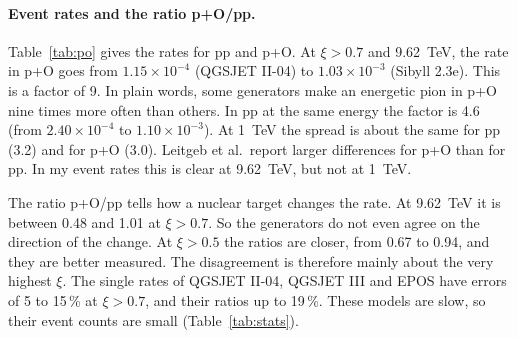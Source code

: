 \documentclass[11pt,a4paper]{article}
\begin{document}
\paragraph{Event rates and the ratio p+O/pp.}
Table~\ref{tab:po} gives the rates for pp and p+O.
At $\xi>0.7$ and 9.62~TeV, the rate in p+O goes from $1.15\times10^{-4}$ (QGSJET II-04) to $1.03\times10^{-3}$ (Sibyll 2.3e).
This is a factor of 9.
In plain words, some generators make an energetic pion in p+O nine times more often than others.
In pp at the same energy the factor is 4.6 (from $2.40\times10^{-4}$ to $1.10\times10^{-3}$).
At 1~TeV the spread is about the same for pp (3.2) and for p+O (3.0).
Leitgeb et al.\ report larger differences for p+O than for pp.
In my event rates this is clear at 9.62~TeV, but not at 1~TeV.

The ratio p+O/pp tells how a nuclear target changes the rate.
At 9.62~TeV it is between 0.48 and 1.01 at $\xi>0.7$.
So the generators do not even agree on the direction of the change.
At $\xi>0.5$ the ratios are closer, from 0.67 to 0.94, and they are better measured.
The disagreement is therefore mainly about the very highest $\xi$.
The single rates of QGSJET II-04, QGSJET III and EPOS have errors of 5 to 15\,\% at $\xi>0.7$, and their ratios up to 19\,\%.
These models are slow, so their event counts are small (Table~\ref{tab:stats}).
\end{document}
